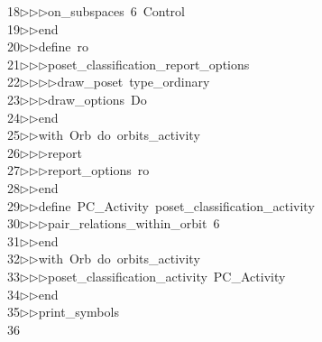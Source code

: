 \begin{tabbing}
18\>$\triangleright$\>$\triangleright$\>$\triangleright$\>on\_subspaces\ 6\ Control\ \\[0pt]
19\>$\triangleright$\>$\triangleright$\>end\ \\[0pt]
20\>$\triangleright$\>$\triangleright$\>define\ ro\ \\[0pt]
21\>$\triangleright$\>$\triangleright$\>$\triangleright$\>poset\_classification\_report\_options\ \\[0pt]
22\>$\triangleright$\>$\triangleright$\>$\triangleright$\>$\triangleright$\>draw\_poset\ type\_ordinary\ \\[0pt]
23\>$\triangleright$\>$\triangleright$\>$\triangleright$\>draw\_options\ Do\ \\[0pt]
24\>$\triangleright$\>$\triangleright$\>end\ \\[0pt]
25\>$\triangleright$\>$\triangleright$\>with\ Orb\ do\ orbits\_activity\ \\[0pt]
26\>$\triangleright$\>$\triangleright$\>$\triangleright$\>report\ \ \\[0pt]
27\>$\triangleright$\>$\triangleright$\>$\triangleright$\>report\_options\ ro\ \\[0pt]
28\>$\triangleright$\>$\triangleright$\>end\ \\[0pt]
29\>$\triangleright$\>$\triangleright$\>define\ PC\_Activity\ poset\_classification\_activity\ \\[0pt]
30\>$\triangleright$\>$\triangleright$\>$\triangleright$\>pair\_relations\_within\_orbit\ 6\ \\[0pt]
31\>$\triangleright$\>$\triangleright$\>end\ \\[0pt]
32\>$\triangleright$\>$\triangleright$\>with\ Orb\ do\ orbits\_activity\ \\[0pt]
33\>$\triangleright$\>$\triangleright$\>$\triangleright$\>poset\_classification\_activity\ PC\_Activity\ \\[0pt]
34\>$\triangleright$\>$\triangleright$\>end\ \\[0pt]
35\>$\triangleright$\>$\triangleright$\>print\_symbols\\[0pt]
36\>\end{tabbing}

